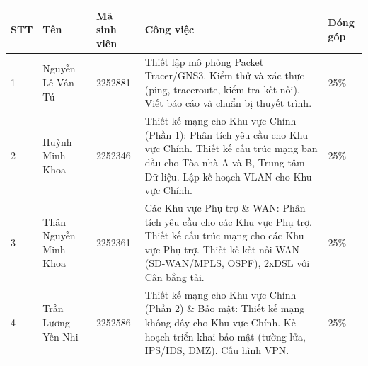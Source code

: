 \documentclass[a4paper,twoside]{article}
\begin{document}






\begin{table}[h]
    \centering
    \begin{tabular}{|p{1cm}|p{4cm}|p{1.5cm}|p{6cm}|p{1.5cm}|}
   
    \hline
    STT  & Tên & Mã sinh viên & Công việc & Đóng góp\\ \hline
       1&Nguyễn Lê Vân Tú  & 2252881 & Thiết lập mô phỏng Packet Tracer/GNS3. Kiểm thử và xác thực (ping, traceroute, kiểm tra kết nối). Viết báo cáo và chuẩn bị thuyết trình. & 25\%  \\ \hline 
       2& Huỳnh Minh Khoa & 2252346 & Thiết kế mạng cho Khu vực Chính (Phần 1): Phân tích yêu cầu cho Khu vực Chính. Thiết kế cấu trúc mạng ban đầu cho Tòa nhà A và B, Trung tâm Dữ liệu. Lập kế hoạch VLAN cho Khu vực Chính. & 25\%  \\ \hline
       3& Thân Nguyễn Minh Khoa &2252361  & Các Khu vực Phụ trợ \& WAN: Phân tích yêu cầu cho các Khu vực Phụ trợ. Thiết kế cấu trúc mạng cho các Khu vực Phụ trợ. Thiết kế kết nối WAN (SD-WAN/MPLS, OSPF), 2xDSL với Cân bằng tải. & 25\%  \\ \hline 
       4& Trần Lương Yến Nhi  & 2252586 & Thiết kế mạng cho Khu vực Chính (Phần 2) \& Bảo mật: Thiết kế mạng không dây cho Khu vực Chính. Kế hoạch triển khai bảo mật (tường lửa, IPS/IDS, DMZ). Cấu hình VPN.& 25\% \\ \hline
    \end{tabular}
    \label{tab:phan_chia_cong_viec1}
\end{table}
\end{document}
